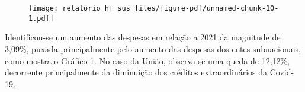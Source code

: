 \documentclass[
  letterpaper,
  DIV=11,
  numbers=noendperiod]{scrartcl}
\begin{document}
\begin{figure}[H]

{\centering \texttt{[image: relatorio\_hf\_sus\_files/figure-pdf/unnamed-chunk-10-1.pdf]}

}

\end{figure}

Identificou-se um aumento das despesas em relação a 2021 da magnitude de
3,09\%, puxada principalmente pelo aumento das despesas dos entes
subnacionais, como mostra o Gráfico 1. No caso da União, observa-se uma
queda de 12,12\%, decorrente principalmente da diminuição dos créditos
extraordinários da Covid-19.
\end{document}
